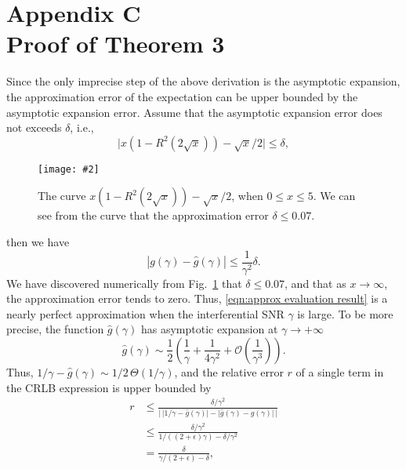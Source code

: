\documentclass[12pt,draftclsnofoot,journal,onecolumn]{IEEEtran}
\theoremstyle{nonumberplain}
\newcommand{\myincludegraphics}[2][width=12cm]{\texttt{[image: \#2]}}
\begin{document}
\section*{Appendix C\\ Proof of Theorem 3}
    Since the only imprecise step of the above derivation is the asymptotic expansion, the approximation error of the expectation can be upper bounded by the asymptotic expansion error. Assume that the asymptotic expansion error does not exceeds $\delta$, i.e.,
    \begin{equation}
        \lvert x(1-R^2(2\sqrt{x}))-\sqrt{x}/2 \rvert \leq \delta,
        \label{eqn:asymptotic error}
    \end{equation}
    \begin{figure}[ht]
        \centering
        \myincludegraphics{figures/asymptotic_expansion.pdf}
        \caption{The curve $x(1-R^2(2\sqrt{x}))-\sqrt{x}/2$, when $0\leq x\leq 5$. We can see from the curve that the approximation error $\delta \leq 0.07$.}
        \label{fig:asymptotic_expansion}
    \end{figure}
    then we have 
    \begin{equation}
        \left| g(\gamma) - \hat{g}(\gamma)\right| \leq \frac{1}{\gamma^2} \delta. 
    \end{equation}
    We have discovered numerically from Fig.~\ref{fig:asymptotic_expansion} that $\delta \leq 0.07$, and that as $x\to \infty$, the approximation error tends to zero. Thus, \eqref{eqn:approx evaluation result} is a nearly perfect approximation when the interferential SNR $\gamma$ is large. To be more precise, the function $\hat{g}(\gamma)$ has asymptotic expansion at $\gamma \to +\infty$
    \begin{equation}
        \hat{g}(\gamma) \sim \frac{1}{2}\left(\frac{1}{\gamma} + \frac{1}{4\gamma^2} + \mathcal{O}(\frac{1}{\gamma^3})\right).
    \end{equation}
    Thus, $1/\gamma - \hat{g}(\gamma) \sim 1/2\,\Theta(1/\gamma)$, and the relative error $r$ of a single term in the CRLB expression is upper bounded by 
    \begin{equation}
        \begin{aligned}
        r & \leq \frac{\delta/\gamma^2}{\lvert \,\lvert 1/\gamma - \hat{g}(\gamma)\rvert - \lvert \hat{g}(\gamma) -  g(\gamma)\rvert\,\rvert} \\
        & \leq \frac{\delta/\gamma^2}{1/((2+\epsilon)\gamma) - \delta/\gamma^2} \\
        & = \frac{\delta}{\gamma/(2+\epsilon) - \delta}, \\
        \end{aligned}
    \end{equation}
\end{document}
